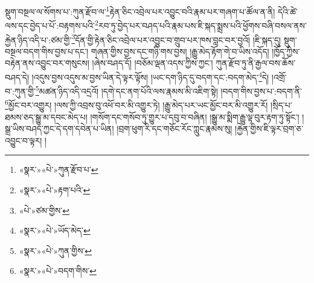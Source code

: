 སྡུག་བསྔལ་ལ་སོགས་པ་:ཀུན་རྫོབ་ལ་\footnote{«སྣར་»«པེ་»ཀུན་རྫོབ་པ་}རྟེན་ཅིང་འབྲེལ་པར་འབྱུང་བའི་རྣམ་པར་གཞག་པ་ཚོལ་ན་ནི། དེའི་ཚེ་ལས་དང་བྱེད་པ་པོ་:བརྟགས་པའི་\footnote{«སྣར་»«པེ་»རྟག་པའི་}རབ་ཏུ་བྱེད་པར་བཤད་པའི་རྣམ་པས་ཇི་སྐད་སྨྲས་པའི་ཕྱོགས་བཞི་བསལ་ནས་རྐྱེན་ཉིད་འདི་པ་:ཙམ་གྱི་\footnote{«པེ་»ཙམ་གྱིས་}དོན་གྱི་རྟེན་ཅིང་འབྲེལ་པར་འབྱུང་བ་གྲུབ་པར་ཁས་བླང་བར་བྱའོ། །ཇི་སྐད་དུ། སྡུག་བསྔལ་བདག་གིས་བྱས་པ་དང་། གཞན་གྱིས་བྱས་དང་གཉི་གས་བྱས། །རྒྱུ་མེད་རྟོག་གེ་བ་ཡིས་འདོད། །ཁྱོད་ཀྱིས་བརྟེན་ནས་འབྱུང་བར་གསུངས། །ཞེས་བཤད་དོ། །བཅོམ་ལྡན་འདས་ཀྱིས་ཀྱང་། ཀུན་རྫོབ་ཏུ་ནི་རྒྱལ་བས་ཆོས་བཤད་དེ། །འདུས་བྱས་འདུས་མ་བྱས་ཡིན་དེ་ལྟར་ལྟོས། །ཡང་དག་ཉིད་དུ་བདག་དང་:བདག་མེད་\footnote{«སྣར་»«པེ་»ཡོད་མེད་}དེ། །འགྲོ་བ་:ཀུན་གྱི་\footnote{«སྣར་»«པེ་»ཀུན་གྱིས་}མཚན་ཉིད་འདི་འདྲའོ། །དགེ་དང་ནག་པོའི་ལས་རྣམས་མི་འཇིག་སྟེ། །བདག་གིས་བྱས་པ་:བདག་ནི་\footnote{«སྣར་»«པེ་»བདག་གིས་}མྱོང་བར་འགྱུར། །ལས་ཀྱི་འབྲས་བུ་འཕོ་བར་མི་འགྱུར་ཏེ། །རྒྱུ་མེད་པར་ཡང་མྱོང་བར་མི་འགྱུར་རོ། །སྲིད་པ་ཐམས་ཅད་སྒྱུ་མ་དབང་མེད་པ། །གསོག་དང་གསོབ་ཏུ་གྱུར་པ་དབུ་བ་བཞིན། །སྒྱུ་མ་སྨིག་རྒྱུ་ལྟ་བུར་རྟག་ཏུ་སྟོང་། །སྒྲ་ཡིས་བཤད་ཀྱང་དེ་དག་དབེན་པ་ཡིན། །བྲག་ཕུག་རི་དང་གཅོང་རོང་ཀླུང་རྣམས་སུ། །རྐྱེན་གྱིས་ཇི་ལྟར་བྲག་ཅ་འབྱུང་བ་ལྟར། །
